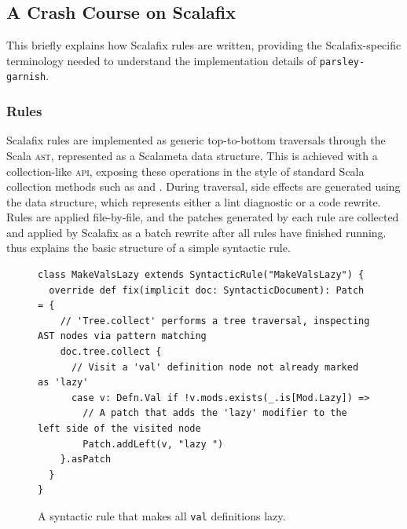 \documentclass[../../main.tex]{subfiles}
\begin{document}

\subsection{A Crash Course on Scalafix}\label{sec:scalafix}
This  briefly explains how Scalafix rules are written,
providing the Scalafix-specific terminology needed to understand the implementation details of \texttt{parsley-garnish}.

\subsubsection{Rules}
Scalafix rules are implemented as generic top-to-bottom traversals through the Scala \textsc{ast}, represented as a Scalameta  data structure.
This is achieved with a collection-like \textsc{api}, exposing these operations in the style of standard Scala collection methods such as  and .
During traversal, side effects are generated using the  data structure, which represents either a lint diagnostic or a code rewrite.
Rules are applied file-by-file, and the patches generated by each rule are collected and applied by Scalafix as a batch rewrite after all rules have finished running.
 thus explains the basic structure of a simple syntactic rule.

\begin{figure}[htbp]
\begin{verbatim}
class MakeValsLazy extends SyntacticRule("MakeValsLazy") {
  override def fix(implicit doc: SyntacticDocument): Patch = {
    // 'Tree.collect' performs a tree traversal, inspecting AST nodes via pattern matching
    doc.tree.collect {
      // Visit a 'val' definition node not already marked as 'lazy'
      case v: Defn.Val if !v.mods.exists(_.is[Mod.Lazy]) =>
        // A patch that adds the 'lazy' modifier to the left side of the visited node
        Patch.addLeft(v, "lazy ")
    }.asPatch
  }
}
\end{verbatim}
\caption{A syntactic rule that makes all \texttt{val} definitions lazy.}
\label{fig:syntactic-rule-ex}
\end{figure}
\end{document}
